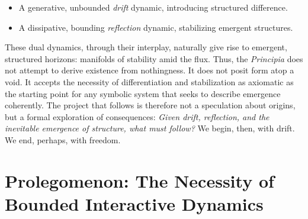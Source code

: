 \begin{itemize}
    \item A generative, unbounded \emph{drift} dynamic, introducing structured difference.
    \item A dissipative, bounding \emph{reflection} dynamic, stabilizing emergent structures.
\end{itemize}
These dual dynamics, through their interplay, naturally give rise to emergent, structured horizons: manifolds of stability amid the flux.  
Thus, the \emph{Principia} does not attempt to derive existence from nothingness. It does not posit form atop a void. It accepts the necessity of differentiation and stabilization as axiomatic \textemdash as the starting point for any symbolic system that seeks to describe emergence coherently.
The project that follows is therefore not a speculation about origins, but a formal exploration of consequences:  
\emph{Given drift, reflection, and the inevitable emergence of structure, what must follow?}
We begin, then, with drift.  
We end, perhaps, with freedom.

\section*{Prolegomenon: The Necessity of Bounded Interactive Dynamics}
\label{sec:opertio_prolegomenon_bounded_interactive_dynamics}

